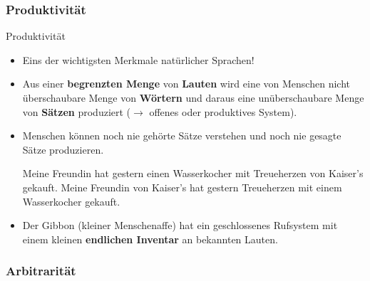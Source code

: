 \subsubsection{Produktivität}

\begin{frame}{Produktivität}
	
	\begin{itemize}
		\item<1-> Eins der wichtigsten Merkmale natürlicher Sprachen!
		\item<2-> Aus einer \textbf{begrenzten Menge} von \textbf{Lauten} wird eine von
                  Menschen nicht überschaubare Menge von \textbf{Wörtern} und daraus eine unüberschaubare Menge von \textbf{Sätzen} produziert ($\rightarrow$ offenes oder produktives System).
		\item<2-> Menschen können noch nie gehörte Sätze verstehen und noch nie gesagte Sätze produzieren.

\pause

\ea Meine Freundin hat gestern einen Wasserkocher mit Treueherzen von Kaiser's gekauft.
\ex Meine Freundin von Kaiser's hat gestern Treueherzen mit einem Wasserkocher gekauft.
\z
				
	\item<3-> Der Gibbon (kleiner Menschenaffe) hat ein geschlossenes Rufsystem mit einem kleinen \textbf{endlichen Inventar} an bekannten Lauten. 
	
	\end{itemize}
\end{frame}


\subsubsection{Arbitrarität}

